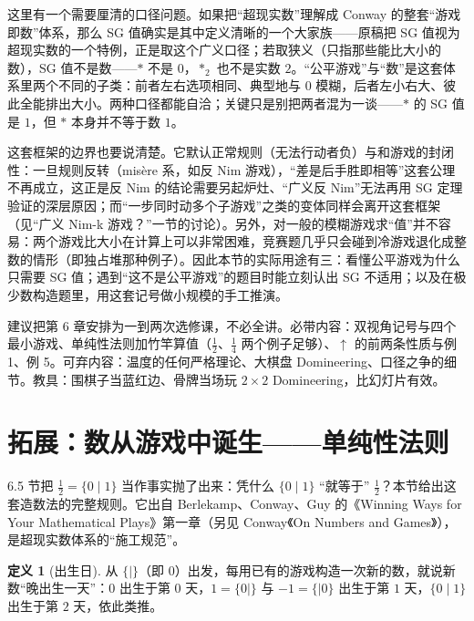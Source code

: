 \documentclass[UTF8,a4paper,11pt,oneside,openany,fontset=fandol]{ctexbook}
\theoremstyle{definition}
\newtheorem{definition}{定义}[chapter]
\begin{document}
\begin{pitfall}[口径与边界]
这里有一个需要厘清的口径问题。如果把“超现实数”理解成 Conway 的整套“游戏即数”体系，那么 SG 值确实是其中定义清晰的一个大家族——原稿把 SG 值视为超现实数的一个特例，正是取这个广义口径；若取狭义（只指那些能比大小的数），SG 值不是数——$\ast$ 不是 $0$，$\ast_2$ 也不是实数 $2$。“公平游戏”与“数”是这套体系里两个不同的子类：前者左右选项相同、典型地与 $0$ 模糊，后者左小右大、彼此全能排出大小。两种口径都能自洽；关键只是别把两者混为一谈——$\ast$ 的 SG 值是 $1$，但 $\ast$ 本身并不等于数 $1$。

这套框架的边界也要说清楚。它默认正常规则（无法行动者负）与和游戏的封闭性：一旦规则反转（misère 系，如反 Nim 游戏），“差是后手胜即相等”这套公理不再成立，这正是反 Nim 的结论需要另起炉灶、“广义反 Nim”无法再用 SG 定理验证的深层原因；而“一步同时动多个子游戏”之类的变体同样会离开这套框架（见“广义 Nim-k 游戏？”一节的讨论）。另外，对一般的模糊游戏求“值”并不容易：两个游戏比大小在计算上可以非常困难，竞赛题几乎只会碰到冷游戏退化成整数的情形（即独占堆那种例子）。因此本节的实际用途有三：看懂公平游戏为什么只需要 SG 值；遇到“这不是公平游戏”的题目时能立刻认出 SG 不适用；以及在极少数构造题里，用这套记号做小规模的手工推演。
\end{pitfall}

\begin{teach}[拓展板块的课堂取舍]
建议把第 6 章安排为一到两次选修课，不必全讲。必带内容：双视角记号与四个最小游戏、单纯性法则加竹竿算值（$\tfrac12$、$\tfrac14$ 两个例子足够）、$\uparrow$ 的前两条性质与例 1、例 5。可弃内容：温度的任何严格理论、大棋盘 Domineering、口径之争的细节。教具：围棋子当蓝红边、骨牌当场玩 $2\times2$ Domineering，比幻灯片有效。
\end{teach}
\section{拓展：数从游戏中诞生——单纯性法则}
6.5 节把 $\tfrac12=\{0\mid 1\}$ 当作事实抛了出来：凭什么 $\{0\mid 1\}$ “就等于” $\tfrac12$？本节给出这套造数法的完整规则。它出自 Berlekamp、Conway、Guy 的《Winning Ways for Your Mathematical Plays》第一章（另见 Conway《On Numbers and Games》），是超现实数体系的“施工规范”。

\begin{definition}[出生日]
从 $\{\mid\}$（即 $0$）出发，每用已有的游戏构造一次新的数，就说新数“晚出生一天”：$0$ 出生于第 $0$ 天，$1=\{0\mid\}$ 与 $-1=\{\mid 0\}$ 出生于第 $1$ 天，$\{0\mid 1\}$ 出生于第 $2$ 天，依此类推。
\end{definition}
\end{document}
